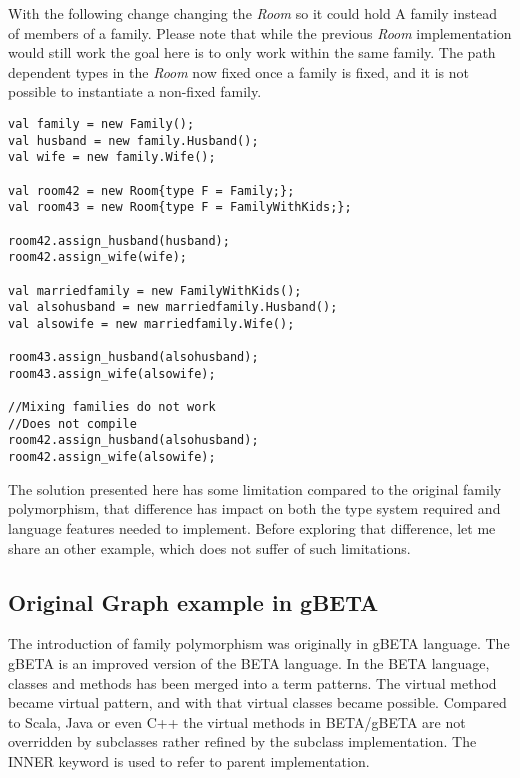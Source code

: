 \documentclass[a4paper, 10pt, conference ]{llncs}
\let\cite\parencite
\begin{document}
With the following change changing the \emph{Room} so it could hold A family instead of members of a family. Please note that while the previous \emph{Room} implementation would still work the goal here is to only work within the same family. The path dependent types in the \emph{Room} now fixed once a family is fixed, and it is not possible to instantiate a non-fixed family.

\begin{verbatim}
val family = new Family();
val husband = new family.Husband();
val wife = new family.Wife();

val room42 = new Room{type F = Family;};
val room43 = new Room{type F = FamilyWithKids;};

room42.assign_husband(husband);
room42.assign_wife(wife);

val marriedfamily = new FamilyWithKids();
val alsohusband = new marriedfamily.Husband();
val alsowife = new marriedfamily.Wife();

room43.assign_husband(alsohusband);
room43.assign_wife(alsowife);

//Mixing families do not work
//Does not compile
room42.assign_husband(alsohusband);
room42.assign_wife(alsowife);
\end{verbatim}

The solution presented here has some limitation compared to the original family polymorphism, that difference has impact on both the type system required and language features needed to implement. Before exploring that difference, let me share an other example, which does not suffer of such limitations. 

\subsection{Original Graph example in gBETA}

The introduction of family polymorphism was originally in gBETA\cite{ernst2000gbeta} language. The gBETA is an improved version of the BETA language. In the BETA language, classes and methods has been merged into a term patterns. The virtual method became virtual pattern, and with that virtual classes became possible. Compared to Scala, Java or even C++ the virtual methods in BETA/gBETA are not overridden by subclasses rather refined by the subclass implementation. The INNER keyword is used to refer to parent implementation.
\end{document}
